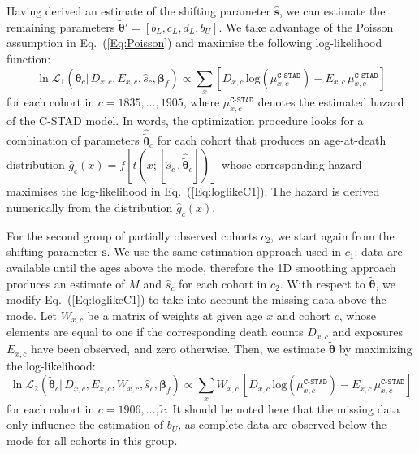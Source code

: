 \documentclass[11pt, a4paper]{article}
\begin{document}
Having derived an estimate of the shifting parameter $\hat{\bm{s}}$, we can estimate the remaining parameters $\tilde{\bm{\theta}}'=\left[b_{L},c_{L},d_{L},b_{U}\right]$. We take advantage of the Poisson assumption in Eq.~(\ref{Eq:Poisson}) and maximise the following log-likelihood function:
\begin{equation}\label{Eq:loglikeC1}
\ln\mathcal{L}_1\left(\tilde{\bm{\theta}}_c | \, D_{x,c} , E_{x,c} , \hat{s}_{c}, \bm{\beta}_{f}
\right) \propto \sum_{x} \left[  D_{x,c} \,
\mathrm{log} \left( \mu^{\texttt{C-STAD}}_{x,c}  \right) - E_{x,c}
\, \mu^{\texttt{C-STAD}}_{x,c} \right] 
\end{equation}
for each cohort in $c=1835,\ldots,1905$, where $\mu^{\texttt{C-STAD}}_{x,c}$ denotes
the estimated hazard of the C-STAD model. In words, the optimization procedure looks for a combination of parameters $\hat{\tilde{\bm{\theta}}}_c$ for each cohort that produces an age-at-death distribution $\hat{g}_c(x)=f\left[t\left(x;\left[ \hat{s}_{c} \,, \hat{\tilde{\bm{\theta}}}_c\right]\right)\right]$ whose corresponding hazard maximises the log-likelihood in Eq.~(\ref{Eq:loglikeC1}). The hazard is derived numerically from the distribution $\hat{g}_c(x)$.

For the second group of partially observed cohorts $c_2$, we start again from the shifting parameter $\bm{s}$. We use the same estimation approach used in $c_1$: data are available until the ages above the mode, therefore the 1D smoothing approach produces an estimate of $M$ and $\hat{s}_c$ for each cohort in $c_2$. With respect to $\tilde{\bm{\theta}}$, we modify Eq.~(\ref{Eq:loglikeC1}) to take into account the missing data above the mode. Let $W_{x,c}$ be a matrix of weights at given age $x$ and cohort $c$, whose elements are equal to one if the corresponding death counts $D_{x,c}$ and exposures $E_{x,c}$ have been observed, and zero otherwise. Then, we estimate $\tilde{\bm{\theta}}$ by maximizing the log-likelihood:
\begin{equation}\label{Eq:loglikeC2}
\ln\mathcal{L}_2\left(\tilde{\bm{\theta}}_c | \, D_{x,c} , E_{x,c} , W_{x,c} , \hat{s}_{c}, \bm{\beta}_{f}
\right) \propto \sum_{x} W_{x,c} \, \left[  D_{x,c} \,
\mathrm{log} \left( \mu^{\texttt{C-STAD}}_{x,c}  \right) - E_{x,c}
\, \mu^{\texttt{C-STAD}}_{x,c} \right] 
\end{equation}
for each cohort in $c=1906,\ldots,\tilde{c}$. It should be noted here that the missing data only influence the estimation of $b_U$, as complete data are observed below the mode for all cohorts in this group.  \par
\end{document}
